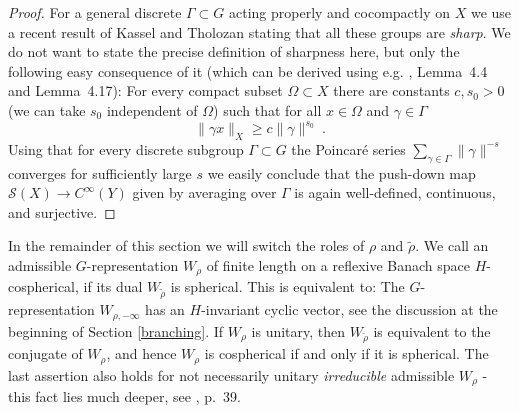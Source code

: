 \documentclass[10]{amsart}
\theoremstyle{remark}
\theoremstyle{definition}
\numberwithin{equation}{section}
\newcommand{\Cal}{\mathcal}
\begin{document}
{\begin{proof}
For a general discrete $\Gamma\subset G$ acting properly and cocompactly on $X$ we use a recent result of Kassel and Tholozan \cite{KT24} stating that all
these groups are {\em sharp}. We do not  want to state the precise definition of sharpness here, but only the following easy consequence of it (which can be derived using e.g. \cite{KK2}, Lemma~4.4 and Lemma~4.17): For every compact subset $\Omega\subset X$ there are constants $c,s_0>0$ (we can take $s_0$ independent of $\Omega$) such that for all $x\in\Omega$ and
$\gamma\in \Gamma$
$$ \|\gamma x\|_X\ge c\|\gamma\|^{s_0}\ .$$
Using that for every discrete subgroup $\Gamma\subset G$ the Poincar\' e series $\sum_{\gamma\in\Gamma} \|\gamma\|^{-s}$ converges  for sufficiently large $s$ we
easily conclude that the push-down map ${\Cal S}(X)\rightarrow C^\infty(Y)$ given by averaging over $\Gamma$ is again well-defined, continuous, and surjective. 
\end{proof}

In the remainder of this section we will switch the roles of $\rho$ and $\tilde\rho$. We call an admissible $G$-representation $W_\rho$ of finite length on a reflexive Banach space $H$-cospherical, if 
its dual $W_{\tilde\rho}$ is spherical. This is equivalent to: The $G$-representation $W_{\rho,-\infty}$ has an $H$-invariant cyclic vector, see the discussion at the beginning of Section \ref{branching}. If $W_\rho$ is unitary, then $W_{\tilde\rho}$ is equivalent to the conjugate of $W_\rho$, and hence $W_\rho$ is cospherical if and only if it is spherical.
The last assertion also holds for not necessarily unitary {\em irreducible} admissible $W_\rho$ - this fact lies much deeper, see \cite{Bien90}, p.~39.

}
\end{document}
